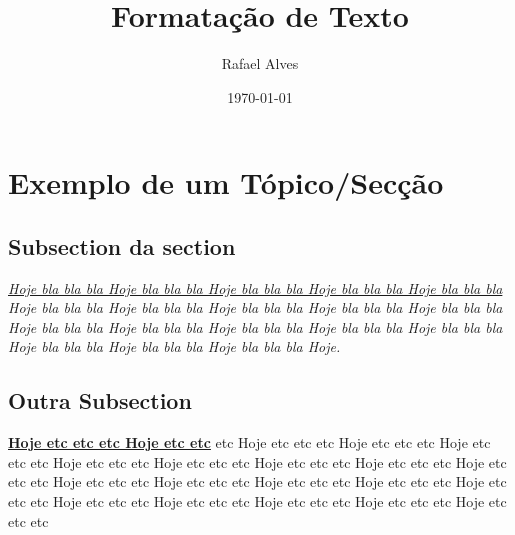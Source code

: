 \documentclass[a4paper,12pt]{article}
\title{Formatação de Texto}
\author{Rafael Alves}
\date{\today}
\begin{document}
\maketitle

\section{Exemplo de um Tópico/Secção}
\subsection{Subsection da section}
\blindtext

\begin{center}
\textbf{ %
\blindtext} %
\end{center}


\begin{flushright} %
\textit{ %
\underline{Hoje bla bla bla Hoje bla bla bla Hoje bla bla bla Hoje bla bla bla Hoje bla bla bla} Hoje bla bla bla Hoje bla bla bla Hoje bla bla bla Hoje bla bla bla Hoje bla bla bla Hoje bla bla bla Hoje bla bla bla Hoje bla bla bla Hoje bla bla bla Hoje bla bla bla Hoje bla bla bla Hoje bla bla bla Hoje bla bla bla Hoje.}
\end{flushright}


\subsection{Outra Subsection}
\textbf{\underline{Hoje etc etc etc Hoje etc etc}} etc Hoje etc etc etc Hoje etc etc etc Hoje etc etc etc Hoje etc etc etc Hoje etc etc etc Hoje etc etc etc Hoje etc etc etc Hoje etc etc etc Hoje etc etc etc Hoje etc etc etc Hoje etc etc etc Hoje etc etc etc Hoje etc etc etc Hoje etc etc etc Hoje etc etc etc Hoje etc etc etc Hoje etc etc etc Hoje etc etc etc 
\end{document}
